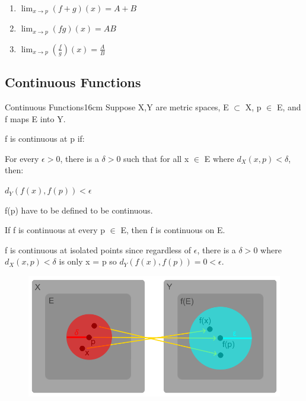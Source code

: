     \begin{enumerate}[label=(\alph*), leftmargin=2cm, itemsep=0.1cm]
        \item $\lim_{x \rightarrow p} (f+g)(x) = A+B$
        \item $\lim_{x \rightarrow p} (fg)(x) = AB$
        \item $\lim_{x \rightarrow p} (\frac{f}{g})(x) = \frac{A}{B}$
    \end{enumerate}

    \newpage





\subsection{ Continuous Functions }

    \begin{definition}{Continuous Functions}{16cm}
        Suppose X,Y are metric spaces, E $\subset$ X, p $\in$ E, and
        f maps E into Y.

        f is {\color{lblue} continuous} at p if:
        
        \begin{adjustbox}{minipage=15cm, right, vspace=0.1cm 0cm}
            For every $\epsilon > 0$, there is a
            $\delta > 0$ such that
            for all x $\in$ E where $d_X(x,p) < \delta$, then:

            \hspace{0.5cm}
            $d_Y(f(x),f(p)) < \epsilon$
        \end{adjustbox}

        f(p) have to be defined to be continuous.

        If f is continuous at every p $\in$ E, then f is continuous on E.

        f is continuous at isolated points since regardless of $\epsilon$,
        there is a $\delta > 0$ where $d_X(x,p) < \delta$ is only x = p so
        $d_Y(f(x),f(p)) = 0 < \epsilon$.
    \end{definition}



    \begin{figure}[h]
        \centering
        \includegraphics[scale=0.38]{Images/11.2.1.png}
    \end{figure}



